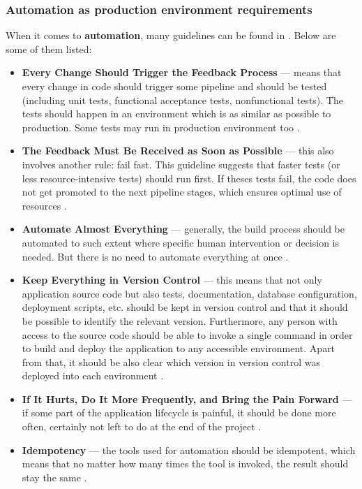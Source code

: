 \subsubsection{Automation as production environment requirements}
\label{Automation as production environment requirements}
When it comes to \textbf{automation}, many guidelines can be found in \cite{book-cicd}. Below are some of them listed:
\begin{itemize}
\item \textbf{Every Change Should Trigger the Feedback Process} --- means that every change in code should trigger some pipeline and should be tested (including unit tests, functional acceptance tests, nonfunctional tests). The tests should happen in an environment which is as similar as possible to production. Some tests may run in production environment too \cite{book-iac,book-cicd}.
\item \textbf{The Feedback Must Be Received as Soon as Possible} --- this also involves another rule: fail fast. This guideline suggests that faster tests (or less resource-intensive tests) should run first. If theses tests fail, the code does not get promoted to the next pipeline stages, which ensures optimal use of resources \cite{book-cicd}.
\item \textbf{Automate Almost Everything} --- generally, the build process should be automated to such extent where specific human intervention or decision is needed. But there is no need to automate everything at once \cite{book-iac,book-cicd}.
\item \textbf{Keep Everything in Version Control} --- this means that not only application source code but also tests, documentation, database configuration, deployment scripts, etc. should be kept in version control and that it should be possible to identify the relevant version. Furthermore, any person with access to the source code should be able to invoke a single command in order to build and deploy the application to any accessible environment. Apart from that, it should be also clear which version in version control was deployed into each environment \cite{book-cicd}.
\item \textbf{If It Hurts, Do It More Frequently, and Bring the Pain Forward} --- if some part of the application lifecycle is painful, it should be done more often, certainly not left to do at the end of the project \cite{book-cicd}.
\item \textbf{Idempotency} --- the tools used for automation should be idempotent, which means that no matter how many times the tool is invoked, the result should stay the same \cite{book-iac}.
\end{itemize}

